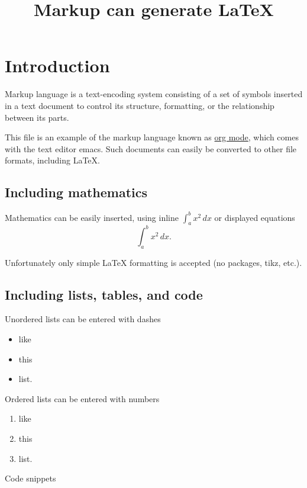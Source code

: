 \documentclass[11pt]{article}
\date{}
\title{Markup can generate \LaTeX{}}
\begin{document}
\maketitle

\section*{Introduction}
\label{sec:org4bc4c4b}

Markup language is a text-encoding system consisting of a set of symbols inserted in a
text document to control its structure, formatting, or the relationship between its parts.

This file is an example of the markup language known as \href{https://en.wikipedia.org/wiki/Org-mode}{org mode}, which comes with the
text editor emacs.  Such documents can easily be converted to other file formats,
including \LaTeX{}.

\subsection*{Including mathematics}
\label{sec:org1761421}

Mathematics can be easily inserted, using inline \(\int_a^b x^2 \, dx\) or displayed
equations
\[\int_a^b x^2 \, dx.\]

Unfortunately only simple \LaTeX{} formatting is accepted (no packages, tikz, etc.).

\subsection*{Including lists, tables, and code}
\label{sec:org32b382f}

Unordered lists can be entered with dashes

\begin{itemize}
\item like
\item this
\item list.
\end{itemize}

Ordered lists can be entered with numbers

\begin{enumerate}
\item like
\item this
\item list.
\end{enumerate}

Code snippets
\end{document}
